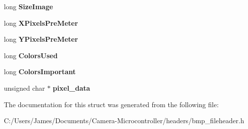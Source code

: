 \begin{DoxyCompactItemize}
long {\bfseries Size\+Image}
\item 
\mbox{\label{struct_bit_map_a459b69d00b23d3a7ccc53cc9fc2750de}} 
long {\bfseries X\+Pixels\+Pre\+Meter}
\item 
\mbox{\label{struct_bit_map_afda2b1f25fd20f2a500f5c894f34e60b}} 
long {\bfseries Y\+Pixels\+Pre\+Meter}
\item 
\mbox{\label{struct_bit_map_aefcbd09c233d1eb048914028df1ba340}} 
long {\bfseries Colors\+Used}
\item 
\mbox{\label{struct_bit_map_ad827cdc643ae28373819dde2a16616ef}} 
long {\bfseries Colors\+Important}
\item 
\mbox{\label{struct_bit_map_aa8c14727e2624c52d367520497782db8}} 
unsigned char $\ast$ {\bfseries pixel\+\_\+data}
\end{DoxyCompactItemize}


The documentation for this struct was generated from the following file\+:\begin{DoxyCompactItemize}
\item 
C\+:/\+Users/\+James/\+Documents/\+Camera-\/\+Microcontroller/headers/bmp\+\_\+fileheader.\+h\end{DoxyCompactItemize}
